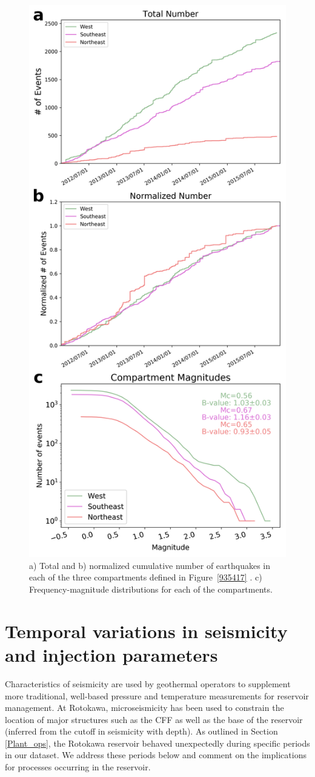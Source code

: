 \begin{figure}[h!]
\begin{center}
\includegraphics[width=0.56\columnwidth]{Chapter_4_Rot/figures/Rot_bval_compartments/Rot_dets_compartments_w_mags_max-like_labels_original}
\caption{{a) Total and b) normalized cumulative number of earthquakes in each of
the three compartments defined in Figure~{\ref{935417}}
. c) Frequency-magnitude distributions for each of the compartments.
{\label{599295}}%
}}
\end{center}
\end{figure}

\section{Temporal variations in seismicity and injection parameters}\label{temporal}
Characteristics of seismicity are used by geothermal operators to supplement more traditional, well-based pressure and temperature measurements for reservoir management. At Rotokawa, microseismicity has been used to constrain the location of major structures such as the CFF as well as the base of the reservoir (inferred from the cutoff in seismicity with depth). As outlined in Section \ref{Plant_ops}, the Rotokawa reservoir behaved unexpectedly during specific periods in our dataset. We address these periods below and comment on the implications for processes occurring in the reservoir.

